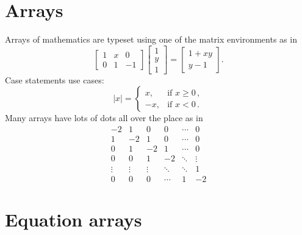 \documentclass[a4paper]{article}
\begin{document}
    
    
    
    
    
    \section{Arrays}
    
    Arrays of mathematics are typeset using one of the matrix environments as 
    in
    \[
        \begin{bmatrix}
            1 & x & 0 \\
            0 & 1 & -1
        \end{bmatrix}\begin{bmatrix}
            1  \\
            y  \\
            1
        \end{bmatrix}
        =\begin{bmatrix}
            1+xy  \\
            y-1
        \end{bmatrix}.
    \]
    Case statements use cases:
    \[
        |x|=\begin{cases}
            x, & \text{if }x\geq 0\,,  \\
            -x, & \text{if }x< 0\,.
        \end{cases}
    \]
    Many arrays have lots of dots all over the place as in
    \[
        \begin{matrix}
            -2 & 1 & 0 & 0 & \cdots & 0  \\
            1 & -2 & 1 & 0 & \cdots & 0  \\
            0 & 1 & -2 & 1 & \cdots & 0  \\
            0 & 0 & 1 & -2 & \ddots & \vdots \\
            \vdots & \vdots & \vdots & \ddots & \ddots & 1  \\
            0 & 0 & 0 & \cdots & 1 & -2
        \end{matrix}
    \]
    
    
    
    
    
    
    \section{Equation arrays}
    
\end{document}
